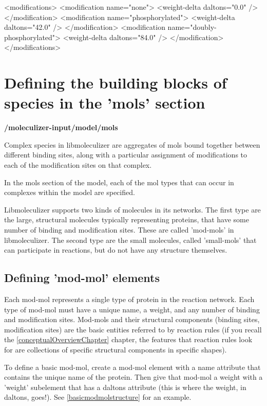 \begin{ExampleXML}[caption=A Sample Modifications Section in a MZR file, label=sampleModificationsSection]
<modifications>
  <modification name="none">
    <weight-delta daltons="0.0" />
  </modification>
  <modification name="phosphorylated">
    <weight-delta daltons="42.0" />
  </modification>
  <modification name="doubly-phosphorylated">
    <weight-delta daltons="84.0" />
  </modification>
</modifications>
\end{ExampleXML}

\section{Defining the building blocks of species in the 'mols'
  section} 
{\bf /moleculizer-input/model/mols }

Complex species in libmoleculizer are aggregates of mols bound
together between different binding sites, along with a particular
assignment of modifications to each of the modification sites on that
complex.

In the mols section of the model, each of the mol types that can
occur in complexes within the model are specified.

Libmoleculizer supports two kinds of molecules in its networks.  The
first type are the large, structural molecules typically representing
proteins, that have some number of binding and modification sites.
These are called 'mod-mols' in libmoleculizer.  The second type are
the small molecules, called 'small-mols' that can participate in
reactions, but do not have any structure themselves.

\subsection{Defining 'mod-mol' elements}
Each mod-mol represents a single type of protein in the reaction
network.  Each type of mod-mol must have a unique name, a weight, and
any number of binding and modification sites. Mod-mols and their
structural components (binding sites, modification sites) are the
basic entities referred to by reaction rules (if you recall the
\ref{conceptualOverviewChapter} chapter, the features that reaction
rules look for are collections of specific structural components in
specific shapes).  

To define a basic mod-mol, create a mod-mol element with a name
attribute that contains the unique name of the protein.  Then give
that mod-mol a weight with a 'weight' subelement that has a daltons
attribute (this is where the weight, in daltons, goes!).  See
\ref{basicmodmolstructure} for an example.

